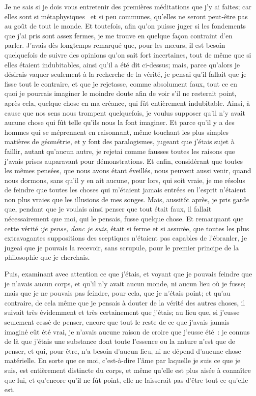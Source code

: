 \documentclass[french,twoside]{book} %
\newcommand\chaptercont{} %
\begin{document}
\chaptercont
\noindent Je ne sais si je dois vous entretenir des premières méditations que j'y ai faites; car elles sont si métaphysiques  et si peu communes, qu'elles ne seront peut-être pas au goût de tout le monde. Et toutefois, afin qu'on puisse juger si les fondements que j'ai pris sont assez fermes, je me trouve en quelque façon contraint d'en parler. J'avais dès longtemps remarqué que, pour les mœurs, il est besoin quelquefois de suivre des opinions qu'on sait fort incertaines, tout de même que si elles étaient indubitables, ainsi qu'il a été dit ci-dessus; mais, parce qu'alors je désirais vaquer seulement à la recherche de la vérité, je pensai qu'il fallait que je fisse tout le contraire, et que je rejetasse, comme absolument faux, tout ce en quoi je pourrais imaginer le moindre doute afin de voir s'il ne resterait point, après cela, quelque chose en ma créance, qui fût entièrement indubitable. Ainsi, à cause que nos sens nous trompent quelquefois, je voulus supposer qu'il n'y avait aucune chose qui fût telle qu'ils nous la font imaginer. Et parce qu'il y a des hommes qui se méprennent en raisonnant, même touchant les plus simples matières de géométrie, et y font des paralogismes, jugeant que j'étais sujet à faillir, autant qu'aucun autre, je rejetai comme fausses toutes les raisons que j'avais prises auparavant pour démonstrations. Et enfin, considérant que toutes les mêmes pensées, que nous avons étant éveillés, nous peuvent aussi venir, quand nous dormons, sans qu'il y en ait aucune, pour lors, qui soit vraie, je me résolus de feindre que toutes les choses qui m'étaient jamais entrées en l'esprit n'étaient non plus vraies que les illusions de mes songes. Mais, aussitôt après, je pris garde que, pendant que je voulais ainsi penser que tout était faux, il fallait nécessairement que moi, qui le pensais, fusse quelque chose. Et remarquant que cette vérité :{\itshape je pense, donc je suis}, était si ferme et si assurée, que toutes les plus extravagantes suppositions des sceptiques n'étaient pas capables de l'ébranler, je jugeai que je pouvais la recevoir, sans scrupule, pour le premier principe de la philosophie que je cherchais.\par
Puis, examinant avec attention ce que j'étais, et voyant que je pouvais feindre que je n'avais aucun corps, et qu'il n'y avait aucun monde, ni aucun lieu où je fusse; mais que je ne pouvais pas feindre, pour cela, que je n'étais point; et qu'au contraire, de cela même que je pensais à douter de la vérité des autres choses, il suivait très évidemment et très certainement que j'étais; au lieu que, si j'eusse seulement cessé de penser, encore que tout le reste de ce que j'avais jamais imaginé eût été vrai, je n'avais aucune raison de croire que j'eusse été : je connus de là que j'étais une substance dont toute l'essence ou la nature n'est que de penser, et qui, pour être, n'a besoin d'aucun lieu, ni ne dépend d'aucune chose matérielle. En sorte que ce moi, c'est-à-dire l'âme par laquelle je suis ce que je suis, est entièrement distincte du corps, et même qu'elle est plus aisée à connaître que lui, et qu'encore qu'il ne fût point, elle ne laisserait pas d'être tout ce qu'elle est.\par
\end{document}
